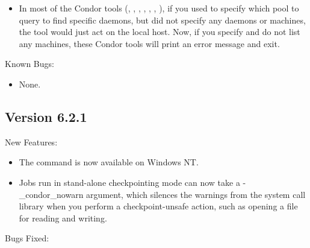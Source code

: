 \begin{itemize}
\item In most of the Condor tools (, ,
, , ,
, ), if you used  to
specify which pool to query to find specific daemons, but did not
specify any daemons or machines, the tool would just act on the local
host.
Now, if you specify  and do not list any machines, these
Condor tools will print an error message and exit.

\end{itemize}

\noindent Known Bugs:
\begin{itemize}
\item None.
\end{itemize}

\subsection{\label{sec:New-6-2-1}Version 6.2.1}

\noindent New Features:

\begin{itemize}

\item The  command is now available on Windows NT.

\item Jobs run in stand-alone checkpointing mode can now take a -\_condor\_nowarn
argument, which silences the warnings from the system call library when you
perform a checkpoint-unsafe action, such as opening a file for reading and
writing.

\end{itemize}

\noindent Bugs Fixed:


